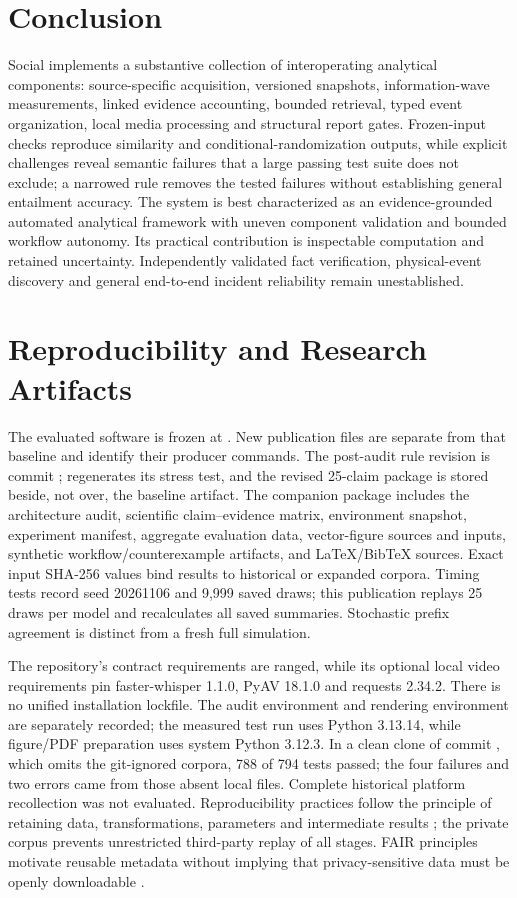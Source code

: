 \section{Conclusion}
Social implements a substantive collection of interoperating analytical components: source-specific acquisition, versioned snapshots, information-wave measurements, linked evidence accounting, bounded retrieval, typed event organization, local media processing and structural report gates. Frozen-input checks reproduce similarity and conditional-randomization outputs, while explicit challenges reveal semantic failures that a large passing test suite does not exclude; a narrowed rule removes the tested failures without establishing general entailment accuracy. The system is best characterized as an evidence-grounded automated analytical framework with uneven component validation and bounded workflow autonomy. Its practical contribution is inspectable computation and retained uncertainty. Independently validated fact verification, physical-event discovery and general end-to-end incident reliability remain unestablished.

\section*{Reproducibility and Research Artifacts}
The evaluated software is frozen at . New publication files are separate from that baseline and identify their producer commands. The post-audit rule revision is commit ;  regenerates its stress test, and the revised 25-claim package is stored beside, not over, the baseline artifact. The companion package includes the architecture audit, scientific claim--evidence matrix, environment snapshot, experiment manifest, aggregate evaluation data, vector-figure sources and inputs, synthetic workflow/counterexample artifacts, and LaTeX/BibTeX sources. Exact input SHA-256 values bind results to historical or expanded corpora. Timing tests record seed 20261106 and 9,999 saved draws; this publication replays 25 draws per model and recalculates all saved summaries. Stochastic prefix agreement is distinct from a fresh full simulation.

The repository's contract requirements are ranged, while its optional local video requirements pin faster-whisper 1.1.0, PyAV 18.1.0 and requests 2.34.2. There is no unified installation lockfile. The audit environment and rendering environment are separately recorded; the measured test run uses Python 3.13.14, while figure/PDF preparation uses system Python 3.12.3. In a clean clone of commit , which omits the git-ignored corpora, 788 of 794 tests passed; the four failures and two errors came from those absent local files. Complete historical platform recollection was not evaluated. Reproducibility practices follow the principle of retaining data, transformations, parameters and intermediate results \citep{sandve2013reproducible,wilson2017practices}; the private corpus prevents unrestricted third-party replay of all stages. FAIR principles motivate reusable metadata without implying that privacy-sensitive data must be openly downloadable \citep{wilkinson2016fair}.

